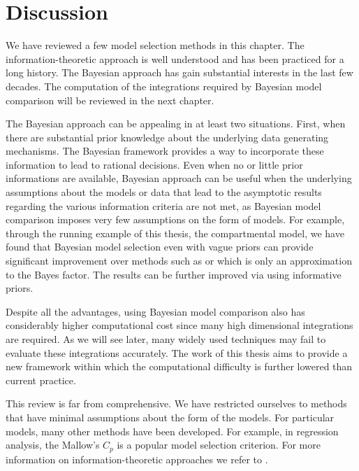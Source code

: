 \section{Discussion}
\label{sec:Model Selection Discussion}

We have reviewed a few model selection methods in this chapter. The
information-theoretic approach is well understood and has been practiced for
a long history. The Bayesian approach has gain substantial interests in the
last few decades. The computation of the integrations required by Bayesian
model comparison will be reviewed in the next chapter.

The Bayesian approach can be appealing in at least two situations. First,
when there are substantial prior knowledge about the underlying data
generating mechanisms. The Bayesian framework provides a way to incorporate
these information to lead to rational decisions. Even when no or little prior
informations are available, Bayesian approach can be useful when the
underlying assumptions about the models or data that lead to the asymptotic
results regarding the various information criteria are not met, as Bayesian
model comparison imposes very few assumptions on the form of models. For
example, through the running example of this thesis, the \pet compartmental
model, we have found that Bayesian model selection even with vague priors can
provide significant improvement over methods such as \aicc or \bic which is
only an approximation to the Bayes factor. The results can be further
improved via using informative priors.

Despite all the advantages, using Bayesian model comparison also has
considerably higher computational cost since many high dimensional
integrations are required. As we will see later, many widely used techniques
may fail to evaluate these integrations accurately. The work of this thesis
aims to provide a new framework within which the computational difficulty is
further lowered than current practice.


This review is far from comprehensive. We have restricted ourselves to methods
that have minimal assumptions about the form of the models. For particular
models, many other methods have been developed. For example, in regression
analysis, the Mallow's $C_p$ is a popular model selection criterion. For more
information on information-theoretic approaches we refer to
\cite{Burnham:2002wc,Claeskens:2008tq}.


